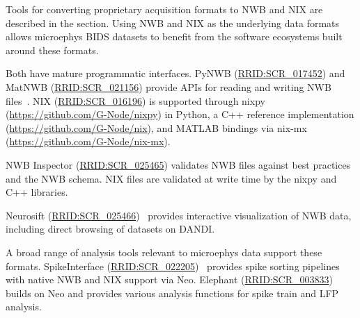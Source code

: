 \documentclass[fleqn,10pt]{article}
\newcommand{\rrid}[1]{\href{https://scicrunch.org/resolver/#1}{#1}}
\begin{document}
Tools for converting proprietary acquisition formats to NWB and NIX are described in the  section.
Using NWB and NIX as the underlying data formats allows microephys BIDS datasets to benefit from the software ecosystems built around these formats.

Both have mature programmatic interfaces.
PyNWB (\rrid{RRID:SCR\_017452}) and MatNWB (\rrid{RRID:SCR\_021156}) provide APIs for reading and writing NWB files~\citep{rubel_neurodata_2022}.
NIX (\rrid{RRID:SCR\_016196}) is supported through nixpy (\url{https://github.com/G-Node/nixpy}) in Python, a C++ reference implementation (\url{https://github.com/G-Node/nix}), and MATLAB bindings via nix-mx (\url{https://github.com/G-Node/nix-mx}).

NWB Inspector (\rrid{RRID:SCR\_025465}) validates NWB files against best practices and the NWB schema.
NIX files are validated at write time by the nixpy and C++ libraries.

Neurosift (\rrid{RRID:SCR\_025466})~\citep{magland_neurosift_2024} provides interactive visualization of NWB data, including direct browsing of datasets on DANDI.

A broad range of analysis tools relevant to microephys data support these formats.
SpikeInterface (\rrid{RRID:SCR\_022205})~\citep{buccino_spikeinterface_2020} provides spike sorting pipelines with native NWB and NIX support via Neo.
Elephant (\rrid{RRID:SCR\_003833})~\citep{denker_collaborative_2018} builds on Neo and provides various analysis functions for spike train and LFP analysis.

\printbibliography
\end{document}
